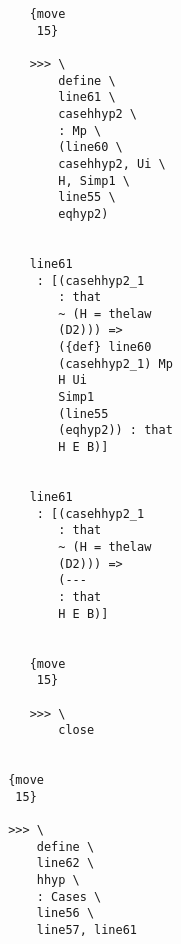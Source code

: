 \documentclass[12pt]{article}
\begin{document}
\begin{verbatim}
                                                {move 
                                                 15}

                                                >>> \
                                                    define \
                                                    line61 \
                                                    casehhyp2 \
                                                    : Mp \
                                                    (line60 \
                                                    casehhyp2, Ui \
                                                    H, Simp1 \
                                                    line55 \
                                                    eqhyp2)


                                                line61 
                                                 : [(casehhyp2_1 
                                                    : that 
                                                    ~ (H = thelaw 
                                                    (D2))) => 
                                                    ({def} line60 
                                                    (casehhyp2_1) Mp 
                                                    H Ui 
                                                    Simp1 
                                                    (line55 
                                                    (eqhyp2)) : that 
                                                    H E B)]


                                                line61 
                                                 : [(casehhyp2_1 
                                                    : that 
                                                    ~ (H = thelaw 
                                                    (D2))) => 
                                                    (--- 
                                                    : that 
                                                    H E B)]


                                                {move 
                                                 15}

                                                >>> \
                                                    close


                                             {move 
                                              15}

                                             >>> \
                                                 define \
                                                 line62 \
                                                 hhyp \
                                                 : Cases \
                                                 line56 \
                                                 line57, line61



\end{verbatim}
\end{document}
